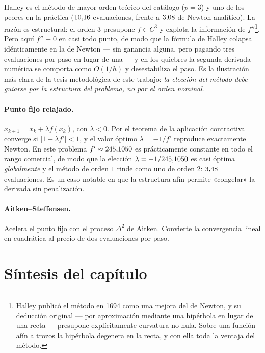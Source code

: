 \begin{criticism}
\label{crit:halley}
Halley es el método de mayor orden teórico del catálogo ($p=3$) y uno de los peores
en la práctica ($10{,}16$ evaluaciones, frente a $3{,}08$ de Newton
analítico). La razón es estructural: el orden $3$ presupone $f\in C^3$ y explota la
información de $f''$\footnote{Halley publicó el método en 1694 como una mejora del de Newton, y su deducción original --- por aproximación mediante una hipérbola en lugar de una recta --- presupone explícitamente curvatura no nula. Sobre una función afín a trozos la hipérbola degenera en la recta, y con ella toda la ventaja del método.}. Pero aquí $f''\equiv0$ en casi todo punto, de modo que la
fórmula de Halley colapsa idénticamente en la de Newton --- sin ganancia alguna,
pero pagando tres evaluaciones por paso en lugar de una --- y en los quiebres la
segunda derivada numérica se comporta como $O(1/h)$ y desestabiliza el paso. Es la
ilustración más clara de la tesis metodológica de este trabajo: \emph{la elección
del método debe guiarse por la estructura del problema, no por el orden nominal}.
\end{criticism}

\paragraph{Punto fijo relajado.}
$x_{k+1}=x_k+\lambda f(x_k)$, con $\lambda<0$. Por el teorema de la aplicación
contractiva converge si $|1+\lambda f'|<1$, y el valor óptimo $\lambda=-1/f'$
reproduce exactamente Newton. En este problema $f'\approx245{,}1050$ es
prácticamente constante en todo el rango comercial, de modo que la elección
$\lambda=-1/245{,}1050$ es casi óptima \emph{globalmente} y el método de
orden $1$ rinde como uno de orden $2$: $3{,}48$ evaluaciones. Es un caso
notable en que la estructura afín permite «congelar» la derivada sin penalización.

\paragraph{Aitken--Steffensen.}
Acelera el punto fijo con el proceso $\Delta^2$ de Aitken. Convierte la
convergencia lineal en cuadrática al precio de dos evaluaciones por paso.

\section{Síntesis del capítulo}


